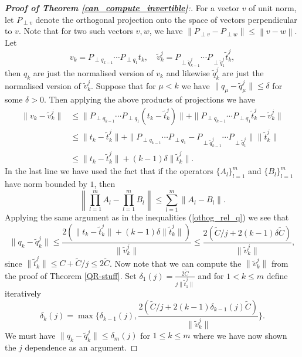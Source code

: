 \documentclass[a4paper,10pt]{article}
\begin{document}
\begin{proof}[\textbf{Proof of Theorem \ref{can_compute_invertible}}:]
For a vector $v$ of unit norm, let $P_{\perp v}$ denote the orthogonal projection onto the space of vectors perpendicular to $v$. Note that for two such vectors $v,w$, we have $\left\|P_{\perp v}-P_{\perp w}\right\|\leq\left\|v-w\right\|$. Let
\begin{equation}
\label{proj_GS}
v_k=P_{\perp q_{k-1}}\cdots P_{\perp q_{1}}t_k,\quad \tilde v_k^j=P_{\perp \tilde q_{k-1}^j}\cdots P_{\perp \tilde q_{1}^j}\tilde t_k^j,
\end{equation}
then $q_k$ are just the normalised version of $v_k$ and likewise $\tilde q_k^j$ are just the normalised version of $\tilde v_k^j$. Suppose that for $\mu<k$ we have $\|q_\mu-\tilde q_\mu^j\|\leq \delta$ for some $\delta>0$. Then applying the above products of projections we have
\begin{align*}
\|v_k-\tilde v_k^j\|&\leq \|P_{\perp q_{k-1}}\cdots P_{\perp q_{1}}(t_k-\tilde t_k^j)\| + \|P_{\perp q_{k-1}}\cdots P_{\perp q_{1}}\tilde t_k^j-\tilde v_k^j\|\\
&\leq \|t_k-\tilde t_k^j\| + \| P_{\perp q_{k-1}}\cdots P_{\perp q_{1}}-P_{\perp \tilde q^j_{k-1}}\cdots P_{\perp \tilde q^j_{1}}\|\|\tilde t^j_k\|\\
&\leq \|t_k-\tilde t_k^j\|+(k-1)\delta\|\tilde t_k^j\|.
\end{align*}
In the last line we have used the fact that if the operators $\{A_l\}_{l=1}^m$ and $\{B_l\}_{l=1}^m$ have norm bounded by $1$, then
$$
\left\|\prod_{l=1}^mA_l-\prod_{l=1}^mB_l\right\|\leq\sum_{l=1}^m\|A_l-B_l\|.
$$
Applying the same argument as in the inequalities (\ref{othog_rel_q}) we see that
\begin{equation}
\label{proj_GS2}
\|q_k-\tilde q_k^j\|\leq \frac{2 (\|t_k-\tilde t_k^j\|+(k-1)\delta\|\tilde t_k^j\|)}{\|\tilde v_k^j\|}\leq \frac{2 ({\tilde C}/{j}+2(k-1)\delta\tilde C)}{\|\tilde v_k^j\|},
\end{equation}
since $\|\tilde t_k^j\|\leq C+\tilde C/j\leq 2\tilde C$. Now note that we can compute the $\|\tilde v_k^j\|$ from the proof of Theorem \ref{QR-stuff}. Set $\delta_1(j)=\frac{2\tilde C}{j\|\tilde t_1^j\|}$ and for $1<k\leq m$ define iteratively
$$
\delta_k(j)=\max\Big\{\delta_{k-1}(j),\frac{2 ({\tilde C}/{j}+2(k-1)\delta_{k-1}(j)\tilde C)}{\|\tilde v_k^j\|}\Big\}.
$$
We must have $\|q_k-\tilde q_k^j\|\leq\delta_m(j)$ for $1\leq k\leq m$ where we have now shown the $j$ dependence as an argument.


\end{proof}
\end{document}
